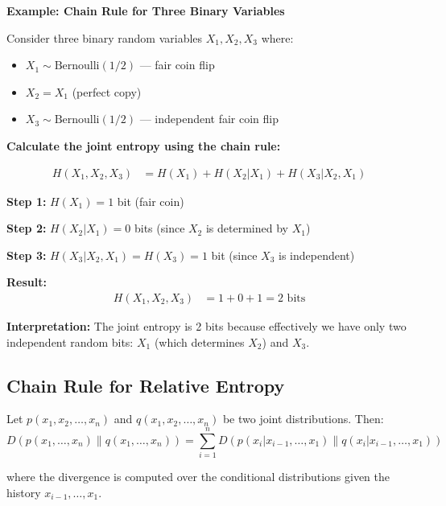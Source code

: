 \documentclass[11pt,a4paper]{book}
\newenvironment{formulabox}[1][Formula]{
    \begin{tcolorbox}[
        enhanced,
        breakable,
        colback=softcoral!10,
        colframe=softcoral!200,
        title=#1,
        fonttitle=\bfseries,
        coltitle=white,
        sharp corners,
        boxrule=1pt,
        left=8pt,
        right=8pt,
        top=6pt,
        bottom=6pt
    ]
}{
    \end{tcolorbox}
}
\newcounter{qna}[chapter]
\renewcommand{\theqna}{\thechapter.\arabic{qna}}
\newenvironment{questionanswerbox}{
    \refstepcounter{qna}%
    \begin{tcolorbox}[
        enhanced,
        breakable,
        colback=softlavender!10,
        colframe=softlavender!200,
        title={Example~\theqna}, %
        fonttitle=\bfseries,
        coltitle=white,
        colbacktitle=softlavender!200,
        sharp corners,
        boxrule=1pt,
        left=8pt,
        right=8pt,
        top=6pt,
        bottom=6pt
    ]
}{
    \end{tcolorbox}
}
\begin{document}
\begin{questionanswerbox}
    \textbf{Example: Chain Rule for Three Binary Variables}
    
    Consider three binary random variables \(X_1, X_2, X_3\) where:
    \begin{itemize}
        \item \(X_1 \sim \text{Bernoulli}(1/2)\) — fair coin flip
        \item \(X_2 = X_1\) (perfect copy)
        \item \(X_3 \sim \text{Bernoulli}(1/2)\) — independent fair coin flip
    \end{itemize}
    
    \textbf{Calculate the joint entropy using the chain rule:}
    
    \begin{align*}
    H(X_1, X_2, X_3) &= H(X_1) + H(X_2|X_1) + H(X_3|X_2, X_1)
    \end{align*}
    
    \textbf{Step 1:} \(H(X_1) = 1\) bit (fair coin)
    
    \textbf{Step 2:} \(H(X_2|X_1) = 0\) bits (since \(X_2\) is determined by \(X_1\))
    
    \textbf{Step 3:} \(H(X_3|X_2, X_1) = H(X_3) = 1\) bit (since \(X_3\) is independent)
    
    \textbf{Result:}
    \begin{align*}
    H(X_1, X_2, X_3) &= 1 + 0 + 1 = 2 \text{ bits}
    \end{align*}
    
    \textbf{Interpretation:} The joint entropy is 2 bits because effectively we have only two independent random bits: \(X_1\) (which determines \(X_2\)) and \(X_3\).
\end{questionanswerbox}

\subsection{Chain Rule for Relative Entropy}

\begin{formulabox}[Chain Rule for Relative Entropy]
    Let \(p(x_1, x_2, \ldots, x_n)\) and \(q(x_1, x_2, \ldots, x_n)\) be two joint distributions. Then:
    \[
    D(p(x_1, \ldots, x_n) \| q(x_1, \ldots, x_n)) = \sum_{i=1}^{n} D(p(x_i | x_{i-1}, \ldots, x_1) \| q(x_i | x_{i-1}, \ldots, x_1))
    \]
    
    where the divergence is computed over the conditional distributions given the history \(x_{i-1}, \ldots, x_1\).
\end{formulabox}
\end{document}
